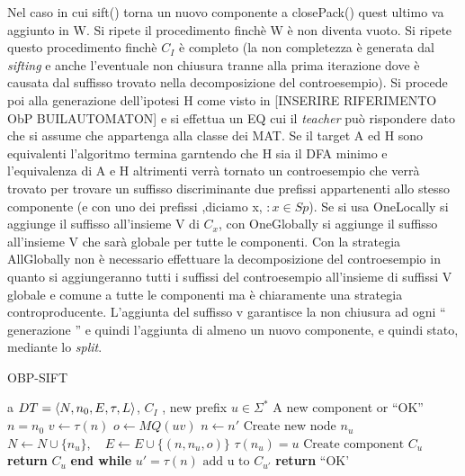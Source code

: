 Nel caso in cui  sift() torna un nuovo componente a closePack() quest ultimo va aggiunto in W. Si ripete il procedimento finchè W è non diventa vuoto. Si ripete questo procedimento finchè $C_{I}$ è completo (la non completezza è generata dal \textit{sifting} e anche l'eventuale non chiusura tranne alla prima iterazione dove è causata dal suffisso trovato nella decomposizione del controesempio). Si procede poi alla generazione dell'ipotesi \ac{H} come visto in [INSERIRE RIFERIMENTO ObP BUILAUTOMATON] e si effettua un \ac{EQ} cui il \textit{teacher} può rispondere dato che si assume che appartenga alla classe dei \ac{MAT}. Se il target A ed \ac{H} sono equivalenti l'algoritmo termina garntendo che \ac{H} sia il DFA minimo e l'equivalenza di A e H altrimenti verrà tornato un controesempio che verrà trovato per trovare un suffisso discriminante due prefissi appartenenti allo stesso componente (e con uno dei prefissi ,diciamo x, $: x \in Sp$). Se si usa OneLocally si aggiunge il suffisso all'insieme V di $C_{x}$, con OneGlobally si aggiunge il suffisso all'insieme V che sarà globale per tutte le componenti. Con la strategia AllGlobally non è necessario effettuare la decomposizione del controesempio in quanto si aggiungeranno tutti i suffissi del controesempio all'insieme di suffissi V globale e comune a tutte le componenti ma è chiaramente una strategia controproducente. L'aggiunta del suffisso v garantisce la non chiusura ad ogni  `` generazione  '' e quindi l'aggiunta di almeno un nuovo componente, e quindi stato, mediante lo \textit{split}.

\begin{algorithm}
\caption{OBP-SIFT}\label{alg:sift}
\begin{algorithmic}[1]
\Statex
\Input a $DT=\Braket{N,n_0,E,\tau,L}$, $C_I$ , new prefix $u \in \Sigma^{*}$   
\Output A new component or  ``OK''
\State $n=n_0$
     \State $v \gets \tau(n)$
     \State $o \gets MQ(uv)$ 
      
     \State $n \gets n'$
     \Else {}
     \State Create new node $n_u$
     \State $N \gets N \cup \{n_u\},\quad E \gets E \cup \{(n,n_u,o)\}$
     \State $\tau(n_u)=u$
     \State $\text{Create component }  C_u$ 
     \State \textbf{return} $C_u$
     \EndIf  
     \EndWhile
      \State \textbf{end while}
     \State $u'=\tau(n)$ 
     \State $\text{add u to } C_{u'}$ 
    \State \textbf{return} ``OK'
\end{algorithmic}
\end{algorithm}

